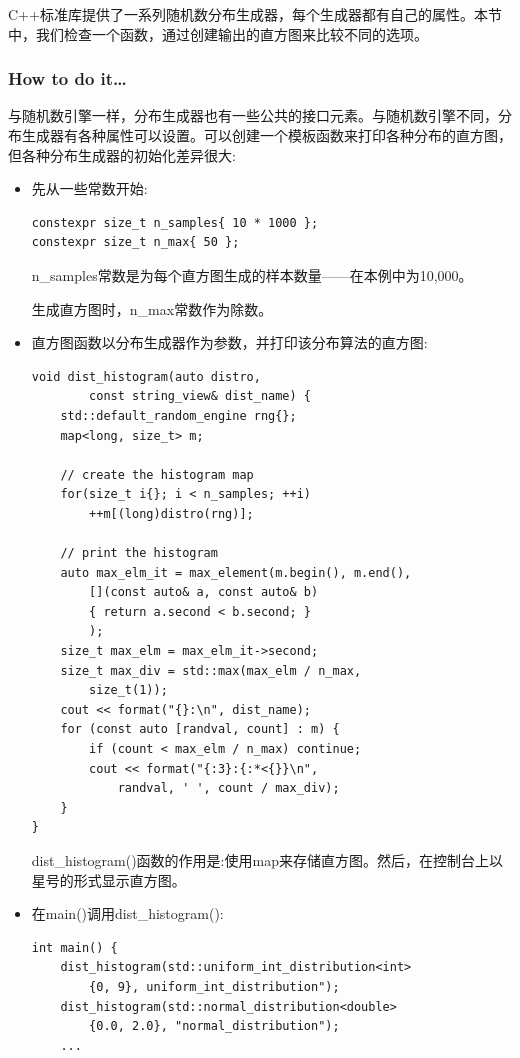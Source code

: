 
C++标准库提供了一系列随机数分布生成器，每个生成器都有自己的属性。本节中，我们检查一个函数，通过创建输出的直方图来比较不同的选项。

\subsubsection{How to do it…}

与随机数引擎一样，分布生成器也有一些公共的接口元素。与随机数引擎不同，分布生成器有各种属性可以设置。可以创建一个模板函数来打印各种分布的直方图，但各种分布生成器的初始化差异很大:

\begin{itemize}
\item 
先从一些常数开始:

\begin{lstlisting}[style=styleCXX]
constexpr size_t n_samples{ 10 * 1000 };
constexpr size_t n_max{ 50 };
\end{lstlisting}

n\_samples常数是为每个直方图生成的样本数量——在本例中为10,000。

生成直方图时，n\_max常数作为除数。

\item 
直方图函数以分布生成器作为参数，并打印该分布算法的直方图:

\begin{lstlisting}[style=styleCXX]
void dist_histogram(auto distro,
		const string_view& dist_name) {
	std::default_random_engine rng{};
	map<long, size_t> m;
	
	// create the histogram map
	for(size_t i{}; i < n_samples; ++i)
		++m[(long)distro(rng)];
	
	// print the histogram
	auto max_elm_it = max_element(m.begin(), m.end(),
		[](const auto& a, const auto& b)
		{ return a.second < b.second; }
		);
	size_t max_elm = max_elm_it->second;
	size_t max_div = std::max(max_elm / n_max,
		size_t(1));
	cout << format("{}:\n", dist_name);
	for (const auto [randval, count] : m) {
		if (count < max_elm / n_max) continue;
		cout << format("{:3}:{:*<{}}\n",
			randval, ' ', count / max_div);
	}
}
\end{lstlisting}

dist\_histogram()函数的作用是:使用map来存储直方图。然后，在控制台上以星号的形式显示直方图。

\item 
在main()调用dist\_histogram():

\begin{lstlisting}[style=styleCXX]
int main() {
	dist_histogram(std::uniform_int_distribution<int>
		{0, 9}, uniform_int_distribution");
	dist_histogram(std::normal_distribution<double>
		{0.0, 2.0}, "normal_distribution");
	...
\end{lstlisting}


\end{itemize}
